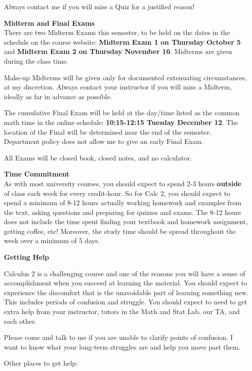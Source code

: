 \documentclass[12pt]{article}
\renewcommand{\emph}[1]{\textsf{\textbf{#1}}}
\newcommand{\localhead}[1]{\par\smallskip\textbf{#1} \smallskip\nobreak\\}%
\def\heading#1{\localhead{\large\emph{#1}}}
\begin{document}
Always contact me if you will miss a Quiz for a justified reason!  

\heading{Midterm and Final Exams}
There are two Midterm Exams this semester, to be held on the dates in the schedule on the course website: \emph{Midterm Exam 1 on Thursday October 5} and \emph{Midterm Exam 2 on Thursday November 16}.  Midterms are given during the class time.

Make-up Midterms will be given only for documented extenuating circumstances, at my discretion. Always contact your instructor if you will miss a Midterm, ideally as far in advance as possible.

The cumulative Final Exam will be held at the day/time listed as the common math time in the online schedule: \textbf{10:15-12:15 Tuesday December 12}.  The location of the Final will be determined near the end of the semester. Department policy does not allow me to give an early Final Exam.

All Exams will be closed book, closed notes, and no calculator.

\heading{Time Commitment}

\vspace*{-.3in}
As with most university courses, you should expect to spend 2-3 hours \emph{outside} of class each week for every credit-hour. So for Calc 2, you should expect to spend a minimum of 8-12 hours actually working homework and examples from the text, asking questions and preparing for quizzes and exams. The 8-12 hours does not include the time spent finding your textbook and homework assignment, getting coffee, etc! Moreover, the study time should be spread throughout the week over a minimum of 5 days.

\newpage
\heading{Getting Help}
\vspace*{-.3in}

Calculus 2 is a challenging course and one of the reasons you will have a sense of accomplishment when you succeed at learning the material. You should expect to experience the discomfort that is the unavoidable part of learning something new. This includes periods of confusion and struggle. You should expect to need to get extra help from your instructor, tutors in the Math and Stat Lab, our TA, and each other. 

Please come and talk to me if you are unable to clarify points of confusion. I want to know what your long-term struggles are and help you move past them.

Other places to get help: 
\end{document}
